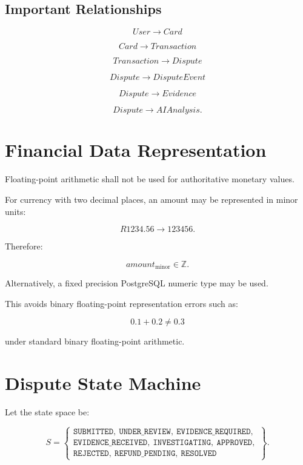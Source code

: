 \documentclass[11pt,a4paper]{article}
\begin{document}
\subsection{Important Relationships}

\[
User \rightarrow Card
\]

\[
Card \rightarrow Transaction
\]

\[
Transaction \rightarrow Dispute
\]

\[
Dispute \rightarrow DisputeEvent
\]

\[
Dispute \rightarrow Evidence
\]

\[
Dispute \rightarrow AIAnalysis.
\]

\section{Financial Data Representation}

Floating-point arithmetic shall not be used for authoritative monetary
values.

For currency with two decimal places, an amount may be represented in
minor units:

\[
R1234.56 \rightarrow 123456.
\]

Therefore:

\[
amount_{\text{minor}} \in \mathbb{Z}.
\]

Alternatively, a fixed precision PostgreSQL numeric type may be used.

This avoids binary floating-point representation errors such as:

\[
0.1 + 0.2 \neq 0.3
\]

under standard binary floating-point arithmetic.

\section{Dispute State Machine}

Let the state space be:

\[
S =
\left\{
\begin{array}{l}
\texttt{SUBMITTED},\ \texttt{UNDER\_REVIEW},\ \texttt{EVIDENCE\_REQUIRED},\\
\texttt{EVIDENCE\_RECEIVED},\ \texttt{INVESTIGATING},\ \texttt{APPROVED},\\
\texttt{REJECTED},\ \texttt{REFUND\_PENDING},\ \texttt{RESOLVED}
\end{array}
\right\}.
\]
\end{document}
